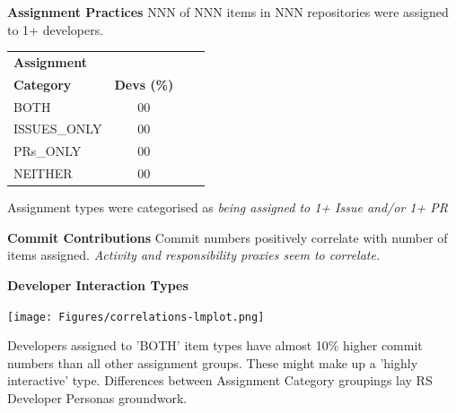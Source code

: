 \documentclass[25pt, a0paper, landscape, margin=10mm, innermargin=15mm, blockverticalspace=10mm, subcolspace=7mm, dvipsnames]{tikzposter} %
\begin{document}
\begin{columns}
{\begin{multicols}{2}
{    \textbf{Assignment Practices} \newline  
    NNN of NNN items in NNN repositories were assigned to 1+ developers.   
    \begin{center}
    \begin{tabular}{ l c c c} 
     \textbf{Assignment}\\ \textbf{Category} & \textbf{Devs (\%)} \\
     BOTH & 00 \\ 
     ISSUES\_ONLY & 00 \\
     PRs\_ONLY & 00 \\
     NEITHER & 00 \\ 
    \end{tabular}
    \end{center}
    Assignment types were categorised as \textit{being assigned to 1+ Issue and/or 1+ PR}
    \vspace*{0.4em} 
    \par
    
   
    \textbf{Commit Contributions} \newline 
    Commit numbers positively correlate with number of items assigned. \textit{Activity and responsibility proxies seem to correlate.}
    \vspace*{0.4em} 
    \par
    
    \textbf{Developer Interaction Types} \newline 
        \begin{tikzfigure}[]
            \texttt{[image: Figures/correlations-lmplot.png]}
        \end{tikzfigure}
    Developers assigned to 'BOTH' item types have almost 10\% higher commit numbers than all other assignment groups. 
    These might make up a 'highly interactive' type. 
    Differences between Assignment Category groupings lay RS Developer Personas groundwork.
    \par
    }
    \end{multicols}
}
\end{columns}
\end{document}
